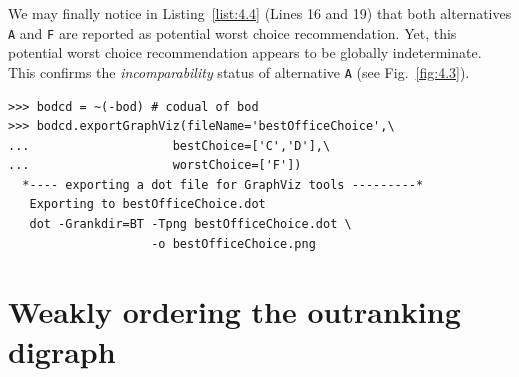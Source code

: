 We may finally notice in Listing~\vref{list:4.4} (Lines 16 and 19) that both alternatives \texttt{A} and \texttt{F} are reported as potential worst choice recommendation. Yet, this potential worst choice recommendation appears to be globally indeterminate. This confirms the \emph{incomparability} status of alternative \texttt{A} (see Fig.~\vref{fig:4.3}).
\begin{lstlisting}
>>> bodcd = ~(-bod) # codual of bod
>>> bodcd.exportGraphViz(fileName='bestOfficeChoice',\
...                    bestChoice=['C','D'],\
...                    worstChoice=['F'])
  *---- exporting a dot file for GraphViz tools ---------*
   Exporting to bestOfficeChoice.dot
   dot -Grankdir=BT -Tpng bestOfficeChoice.dot \
                    -o bestOfficeChoice.png
\end{lstlisting}

\section{Weakly ordering the outranking digraph}
\label{sec:4.6}


